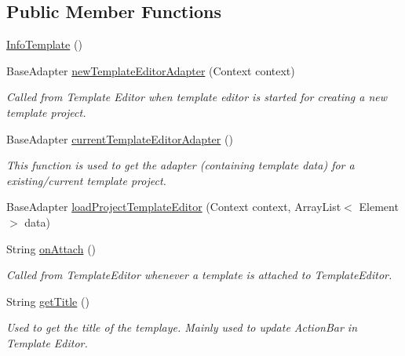 \subsection*{Public Member Functions}
\begin{DoxyCompactItemize}
\item 
\hyperlink{classorg_1_1buildmlearn_1_1toolkit_1_1templates_1_1InfoTemplate_a3f9f925728b785f52105776cf4ba0e44}{Info\-Template} ()
\item 
Base\-Adapter \hyperlink{classorg_1_1buildmlearn_1_1toolkit_1_1templates_1_1InfoTemplate_ab4d81e3a7da28f406ca3b6e8c74bb69c}{new\-Template\-Editor\-Adapter} (Context context)
\begin{DoxyCompactList}\small\item\em Called from Template Editor when template editor is started for creating a new template project. \end{DoxyCompactList}\item 
Base\-Adapter \hyperlink{classorg_1_1buildmlearn_1_1toolkit_1_1templates_1_1InfoTemplate_adf457576e88abf2859b9d8cfb8097eba}{current\-Template\-Editor\-Adapter} ()
\begin{DoxyCompactList}\small\item\em This function is used to get the adapter (containing template data) for a existing/current template project. \end{DoxyCompactList}\item 
Base\-Adapter \hyperlink{classorg_1_1buildmlearn_1_1toolkit_1_1templates_1_1InfoTemplate_a3133856410f82ddd51ebd42f54a56cf6}{load\-Project\-Template\-Editor} (Context context, Array\-List$<$ Element $>$ data)
\item 
String \hyperlink{classorg_1_1buildmlearn_1_1toolkit_1_1templates_1_1InfoTemplate_ada0d67fc9e941bb29703a19467216a92}{on\-Attach} ()
\begin{DoxyCompactList}\small\item\em Called from Template\-Editor whenever a template is attached to Template\-Editor. \end{DoxyCompactList}\item 
String \hyperlink{classorg_1_1buildmlearn_1_1toolkit_1_1templates_1_1InfoTemplate_aeff54c9ca6a2925582e01d6fffea0b71}{get\-Title} ()
\begin{DoxyCompactList}\small\item\em Used to get the title of the templaye. Mainly used to update Action\-Bar in Template Editor. \end{DoxyCompactList}\item 

\end{DoxyCompactItemize}
